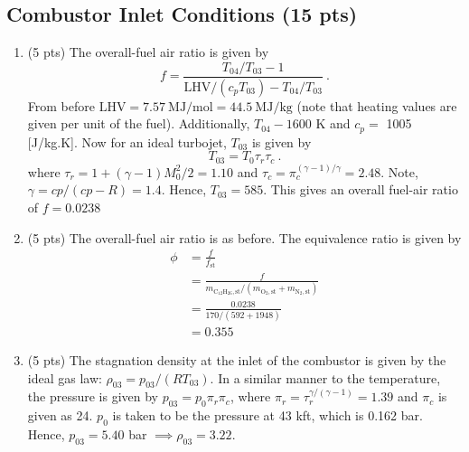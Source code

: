\documentclass[12pt]{article}
\newcommand{\dod}{\mathrm{C}_{12}\mathrm{H}_{26}}
\newcommand{\nit}{\mathrm{N}_{2}}
\newcommand{\ox}{\mathrm{O}_{2}}
\begin{document}
	\subsection{Combustor Inlet Conditions (15 pts)}
		\begin{enumerate}[label=(\arabic*)]
			\item (5 pts)
				The overall-fuel air ratio is given by
				\begin{equation}
					f = \frac{T_{04}/T_{03}-1}{\mathrm{LHV}/(c_pT_{03})-T_{04}/T_{03}}\ .
				\end{equation}
				From before $\mathrm{LHV}=7.57\ \mathrm{MJ/mol}=44.5\ \mathrm{MJ/kg}$ (note that heating values are given per unit of the fuel). Additionally, $T_{04}-1600$ K and $c_p=$ 1005 [J/kg.K]. Now for an ideal turbojet, $T_{03}$ is given by
				\begin{equation}
					T_{03}=T_0\tau_{r}\tau_{c}\ .
				\end{equation}
				where $\tau_r=1+(\gamma-1)M_0^2/2=1.10$ and $\tau_c=\pi_c^{(\gamma-1)/\gamma}=2.48$. Note, $\gamma=cp/(cp-R)=1.4$. Hence, $T_{03}=585$. This gives an overall fuel-air ratio of $\boxed{f=0.0238}$
			\item (5 pts)
				The overall-fuel air ratio is as before. The equivalence ratio is given by 
				\begin{equation}
					\begin{aligned}
						\phi&=\frac{f}{f_\mathrm{st}}\\
							&=\frac{f}{m_{\dod,\mathrm{st}}/\left(m_{\ox,\mathrm{st}}+m_{\nit,\mathrm{st}}\right)}\\
							&=\frac{0.0238}{170/(592+1948)}\\
							&=\boxed{0.355}
					\end{aligned}
				\end{equation}
			\item (5 pts)
				The stagnation density at the inlet of the combustor is given by the ideal gas law: $\rho_{03}=p_{03}/(RT_{03})$. In a similar manner to the temperature, the pressure is given by $p_{03}=p_0\pi_r\pi_c$, where $\pi_r=\tau_r^{\gamma/(\gamma-1)}=1.39$ and $\pi_c$ is given as 24. $p_0$ is taken to be the pressure at 43 kft, which is 0.162 bar. Hence, $p_{03}=5.40$ bar $\implies \boxed{\rho_{03}=3.22}$. 
		\end{enumerate}
\end{document}
